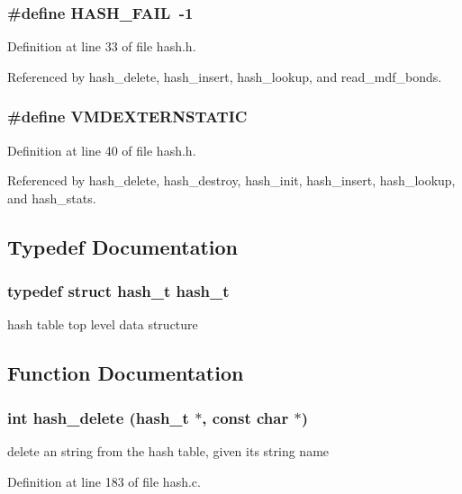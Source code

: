 \subsubsection{\setlength{\rightskip}{0pt plus 5cm}\#define HASH\_\-FAIL\ -1}\label{hash_8h_a0}




Definition at line 33 of file hash.h.

Referenced by hash\_\-delete, hash\_\-insert, hash\_\-lookup, and read\_\-mdf\_\-bonds.
\subsubsection{\setlength{\rightskip}{0pt plus 5cm}\#define VMDEXTERNSTATIC}\label{hash_8h_a1}




Definition at line 40 of file hash.h.

Referenced by hash\_\-delete, hash\_\-destroy, hash\_\-init, hash\_\-insert, hash\_\-lookup, and hash\_\-stats.

\subsection{Typedef Documentation}
\subsubsection{\setlength{\rightskip}{0pt plus 5cm}typedef struct hash\_\-t  hash\_\-t}\label{hash_8h_a2}


hash table top level data structure 

\subsection{Function Documentation}
\subsubsection{\setlength{\rightskip}{0pt plus 5cm}int hash\_\-delete ({\bf hash\_\-t} $\ast$, const char $\ast$)}\label{hash_8h_a6}


delete an string from the hash table, given its string name 

Definition at line 183 of file hash.c.
